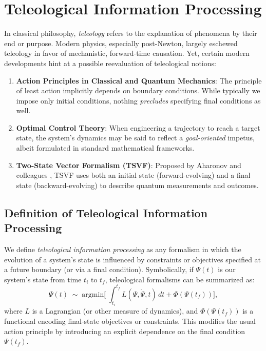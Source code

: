 \documentclass[11pt]{article}
\begin{document}
\section{Teleological Information Processing}
\label{sec:teleological}
In classical philosophy, \emph{teleology} refers to the explanation of phenomena by their end or purpose. Modern physics, especially post-Newton, largely eschewed teleology in favor of mechanistic, forward-time causation. Yet, certain modern developments hint at a possible reevaluation of teleological notions:

\begin{enumerate}
    \item \textbf{Action Principles in Classical and Quantum Mechanics}: The principle of least action implicitly depends on boundary conditions. While typically we impose only initial conditions, nothing \emph{precludes} specifying final conditions as well.
    \item \textbf{Optimal Control Theory}: When engineering a trajectory to reach a target state, the system’s dynamics may be said to reflect a \emph{goal-oriented} impetus, albeit formulated in standard mathematical frameworks.
    \item \textbf{Two-State Vector Formalism (TSVF)}: Proposed by Aharonov and colleagues \cite{Aharonov1964}, TSVF uses both an initial state (forward-evolving) and a final state (backward-evolving) to describe quantum measurements and outcomes.
\end{enumerate}

\subsection{Definition of Teleological Information Processing}
\label{subsec:teleo_definition}
We define \emph{teleological information processing} as any formalism in which the evolution of a system’s state is influenced by constraints or objectives specified at a future boundary (or via a final condition). Symbolically, if $\Psi(t)$ is our system’s state from time $t_i$ to $t_f$, teleological formalisms can be summarized as:
\begin{equation}
\label{eq:teleo_abstract}
\Psi(t) \;\sim\; \mathrm{argmin}\bigg[\;\int_{t_i}^{t_f} L(\Psi, \dot{\Psi}, t)\, dt + \Phi(\Psi(t_f))\bigg],
\end{equation}
where $L$ is a Lagrangian (or other measure of dynamics), and $\Phi(\Psi(t_f))$ is a functional encoding final-state objectives or constraints. This modifies the usual action principle by introducing an explicit dependence on the final condition $\Psi(t_f)$.
\end{document}
